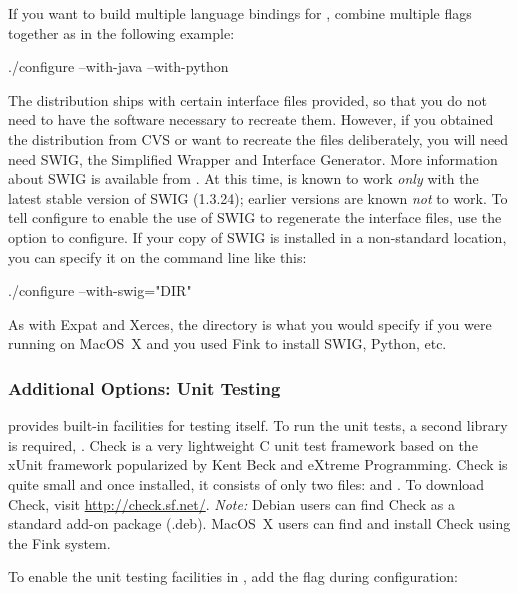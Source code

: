 \documentclass{sbmlmanual}
\begin{document}
If you want to build multiple language bindings for \libsbml{}, combine
multiple flags together as in the following example:

\begin{shellVerbatim}
  ./configure --with-java --with-python
\end{shellVerbatim}

The \libsbml{} distribution ships with certain interface files
provided, so that you do not need to have the software necessary to
recreate them.  However, if you obtained the \libsbml{} distribution
from CVS or want to recreate the files deliberately, you will need
need SWIG, the Simplified Wrapper and Interface Generator.  More
information about SWIG is available from .
At this time, \libsbml{} is known to work \emph{only} with the latest
stable version of SWIG (1.3.24); earlier versions are known \emph{not}
to work.  To tell configure to enable the use of SWIG to regenerate
the interface files, use the  option to configure.
If your copy of SWIG is installed in a non-standard location, you can
specify it on the  command line like this:

\begin{shellVerbatim}
  ./configure --with-swig="DIR"
\end{shellVerbatim}

As with Expat and Xerces, the  directory is what you would
specify if you were running on MacOS~X and you used Fink to install SWIG,
Python, etc.


\subsubsection{Additional Options: Unit Testing}

\libsbml{} provides built-in facilities for testing itself.  To run the
unit tests, a second library is required, .  Check is a
very lightweight C unit test framework based on the xUnit framework
popularized by Kent Beck and eXtreme Programming.  Check is quite small
and once installed, it consists of only two files:  and
.  To download Check, visit \url{http://check.sf.net/}.
\emph{Note:} Debian users can find Check as a standard add-on package
(.deb).  MacOS~X users can find and install Check using the Fink system.

To enable the unit testing facilities in \libsbml{}, add the
 flag during configuration:
\end{document}
